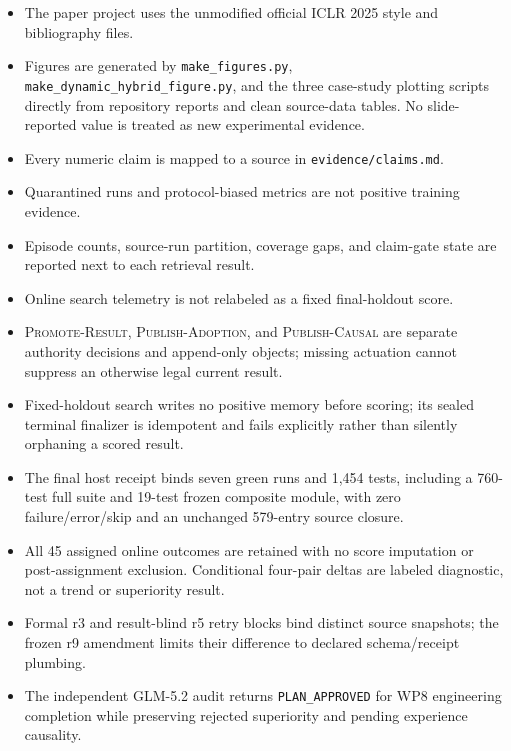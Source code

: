 \documentclass{article}
\begin{document}
{\small
\begin{itemize}[leftmargin=*,itemsep=0pt,topsep=2pt]
  \item The paper project uses the unmodified official ICLR 2025 style and
  bibliography files.
  \item Figures are generated by \texttt{make\_figures.py},
  \texttt{make\_dynamic\_hybrid\_figure.py}, and the three case-study plotting
  scripts directly from repository reports and clean source-data tables.  No
  slide-reported value is treated as new experimental evidence.
  \item Every numeric claim is mapped to a source in
  \texttt{evidence/claims.md}.
  \item Quarantined runs and protocol-biased metrics are not positive training
  evidence.
  \item Episode counts, source-run partition, coverage gaps, and claim-gate state
  are reported next to each retrieval result.
  \item Online search telemetry is not relabeled as a fixed final-holdout score.
  \item \textsc{Promote-Result}, \textsc{Publish-Adoption}, and
  \textsc{Publish-Causal} are separate authority decisions and append-only
  objects; missing actuation cannot suppress an otherwise legal current result.
  \item Fixed-holdout search writes no positive memory before scoring; its
  sealed terminal finalizer is idempotent and fails explicitly rather than
  silently orphaning a scored result.
  \item The final host receipt binds seven green runs and 1,454 tests, including
  a 760-test full suite and 19-test frozen composite module, with zero
  failure/error/skip and an unchanged 579-entry source closure.
  \item All 45 assigned online outcomes are retained with no score imputation or
  post-assignment exclusion.  Conditional four-pair deltas are labeled
  diagnostic, not a trend or superiority result.
  \item Formal r3 and result-blind r5 retry blocks bind distinct source
  snapshots; the frozen r9 amendment limits their difference to declared
  schema/receipt plumbing.
  \item The independent GLM-5.2 audit returns \texttt{PLAN\_APPROVED} for WP8
  engineering completion while preserving rejected superiority and pending
  experience causality.
\end{itemize}
}
\end{document}
